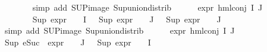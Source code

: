 \begin{isabellebody}
\ \ \ \ \ \ \isamarkupfalse%
\ {\isacharparenleft}{\kern0pt}simp\ add{\isacharcolon}{\kern0pt}\ SUP{\isacharunderscore}{\kern0pt}image\ Sup{\isacharunderscore}{\kern0pt}union{\isacharunderscore}{\kern0pt}distrib{\isacharparenright}{\kern0pt}\isanewline
\ \ \ \ \isamarkupfalse%
\ {\isachardoublequoteopen}expr{\isacharunderscore}{\kern0pt}{}\ {\isacharparenleft}{\kern0pt}hml{\isacharunderscore}{\kern0pt}conj\ I\ J\ {\isasymPhi}{\isacharparenright}{\kern0pt}\ {\isasymle}\ {}{\isachardoublequoteclose}\isanewline
\ \ \ \ \ \ \isamarkupfalse%
\ {\isacartoucheopen}Sup\ {\isacharparenleft}{\kern0pt}expr{\isacharunderscore}{\kern0pt}{}\ {\isacharbackquote}{\kern0pt}\ {\isacharparenleft}{\kern0pt}{\isasymPhi}\ {\isacharbackquote}{\kern0pt}\ I{\isacharparenright}{\kern0pt}{\isacharparenright}{\kern0pt}\ {\isasymle}\ {}{\isacartoucheclose}\ {\isacartoucheopen}Sup\ {\isacharparenleft}{\kern0pt}{\isacharparenleft}{\kern0pt}expr{\isacharunderscore}{\kern0pt}{}\ {\isasymcirc}\ {\isasymPhi}{\isacharparenright}{\kern0pt}\ {\isacharbackquote}{\kern0pt}\ J{\isacharparenright}{\kern0pt}\ {\isasymle}\ {}{\isacartoucheclose}\ {\isacartoucheopen}Sup\ {\isacharparenleft}{\kern0pt}{\isacharparenleft}{\kern0pt}expr{\isacharunderscore}{\kern0pt}{}\ {\isasymcirc}\ {\isasymPhi}{\isacharparenright}{\kern0pt}\ {\isacharbackquote}{\kern0pt}\ J{\isacharparenright}{\kern0pt}\ {\isasymle}\ {}{\isacartoucheclose}\isanewline
\ \ \ \ \ \ \isamarkupfalse%
\ {\isacharparenleft}{\kern0pt}simp\ add{\isacharcolon}{\kern0pt}\ SUP{\isacharunderscore}{\kern0pt}image\ Sup{\isacharunderscore}{\kern0pt}union{\isacharunderscore}{\kern0pt}distrib{\isacharparenright}{\kern0pt}\isanewline
\ \ \ \ \isamarkupfalse%
\ {\isachardoublequoteopen}expr{\isacharunderscore}{\kern0pt}{}\ {\isacharparenleft}{\kern0pt}hml{\isacharunderscore}{\kern0pt}conj\ I\ J\ {\isasymPhi}{\isacharparenright}{\kern0pt}\ {\isasymle}\ {}{\isachardoublequoteclose}\isanewline
\ \ \ \ \ \ \isamarkupfalse%
\ {\isacartoucheopen}Sup\ {\isacharparenleft}{\kern0pt}{\isacharparenleft}{\kern0pt}eSuc\ {\isasymcirc}\ expr{\isacharunderscore}{\kern0pt}{}\ {\isasymcirc}\ {\isasymPhi}{\isacharparenright}{\kern0pt}\ {\isacharbackquote}{\kern0pt}\ J{\isacharparenright}{\kern0pt}\ {\isasymle}\ {}{\isacartoucheclose}\ {\isacartoucheopen}Sup\ {\isacharparenleft}{\kern0pt}expr{\isacharunderscore}{\kern0pt}{}\ {\isacharbackquote}{\kern0pt}\ {\isacharparenleft}{\kern0pt}{\isasymPhi}\ {\isacharbackquote}{\kern0pt}\ I{\isacharparenright}{\kern0pt}{\isacharparenright}{\kern0pt}\ {\isasymle}\ {}{\isacartoucheclose}\isanewline

\end{isabellebody}
